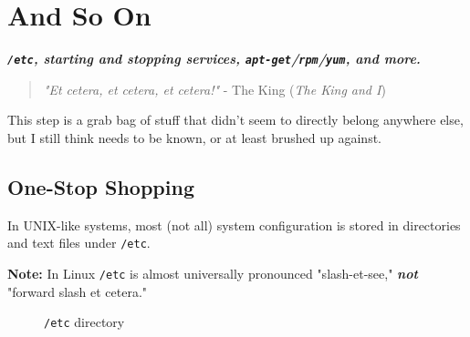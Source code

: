 \documentclass[10pt,american,]{book}
\numberwithin{figure}{chapter}
\DeclareRobustCommand{\drcap}[1]{\begin{figure}[H]\caption{#1}\end{figure}}
\begin{document}
\hypertarget{and-so-on}{\chapter{And So On}\label{and-so-on}}

\textbf{\emph{\texttt{/etc}, starting and stopping services,
\texttt{apt-get}/\texttt{rpm}/\texttt{yum}, and more.}}

\begin{quote}
\emph{"Et cetera, et cetera, et cetera!"} - The King (\emph{The King and
I})
\end{quote}

This step is a grab bag of stuff that didn't seem to directly belong
anywhere else, but I still think needs to be known, or at least brushed
up against.

\section*{One-Stop Shopping}\label{one-stop-shopping}

In UNIX-like systems, most (not all) system configuration is stored in
directories and text files under \texttt{/etc}.

\textbf{Note:} In Linux \texttt{/etc} is almost universally pronounced
"slash-et-see," \textbf{\emph{not}} "forward slash et cetera."

\drcap{\texttt{/etc} directory}
\end{document}
